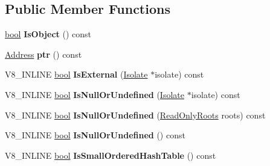 \subsection*{Public Member Functions}
\begin{DoxyCompactItemize}
\item 
\mbox{\label{classv8_1_1internal_1_1Object_a1e779ffe0e0258919d3a860e853e60db}} 
\mbox{\hyperlink{classbool}{bool}} {\bfseries Is\+Object} () const
\item 
\mbox{\label{classv8_1_1internal_1_1Object_ac1e5380c8e8ca2de345c786303fec509}} 
\mbox{\hyperlink{classuintptr__t}{Address}} {\bfseries ptr} () const
\item 
\mbox{\label{classv8_1_1internal_1_1Object_a2932a510d32a2210752d3e3e970dac61}} 
V8\+\_\+\+I\+N\+L\+I\+NE \mbox{\hyperlink{classbool}{bool}} {\bfseries Is\+External} (\mbox{\hyperlink{classv8_1_1internal_1_1Isolate}{Isolate}} $\ast$isolate) const
\item 
\mbox{\label{classv8_1_1internal_1_1Object_a92b5887a176ae1fe320dfb2a37401f65}} 
V8\+\_\+\+I\+N\+L\+I\+NE \mbox{\hyperlink{classbool}{bool}} {\bfseries Is\+Null\+Or\+Undefined} (\mbox{\hyperlink{classv8_1_1internal_1_1Isolate}{Isolate}} $\ast$isolate) const
\item 
\mbox{\label{classv8_1_1internal_1_1Object_a8e4d73b945a3942d9f4c191bb5f273e8}} 
V8\+\_\+\+I\+N\+L\+I\+NE \mbox{\hyperlink{classbool}{bool}} {\bfseries Is\+Null\+Or\+Undefined} (\mbox{\hyperlink{classv8_1_1internal_1_1ReadOnlyRoots}{Read\+Only\+Roots}} roots) const
\item 
\mbox{\label{classv8_1_1internal_1_1Object_a9dec1abbdac6e62936a8c19c3bfb0a3b}} 
V8\+\_\+\+I\+N\+L\+I\+NE \mbox{\hyperlink{classbool}{bool}} {\bfseries Is\+Null\+Or\+Undefined} () const
\item 
\mbox{\label{classv8_1_1internal_1_1Object_aed5ae768120dce26482aa93f815cfba0}} 
V8\+\_\+\+I\+N\+L\+I\+NE \mbox{\hyperlink{classbool}{bool}} {\bfseries Is\+Small\+Ordered\+Hash\+Table} () const
\item 

\end{DoxyCompactItemize}
